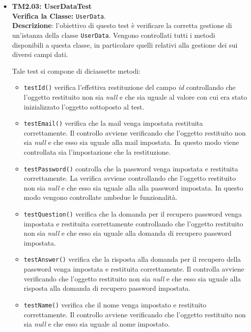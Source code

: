 \begin{itemize}
\item \textbf{TM2.03: UserDataTest}\\
\textbf{Verifica la Classe:} \texttt{UserData}.\\
\textbf{Descrizione}: l'obiettivo di questo test è verificare la corretta gestione di un'istanza della classe \texttt{UserData}. Vengono controllati tutti i metodi disponibili a questa classe, in particolare quelli relativi alla gestione dei sui diversi campi dati.

Tale test si compone di diciassette metodi:
\begin{itemize}

\item \texttt{testId()} verifica l'effettiva restituzione del campo \textit{id} controllando che l'oggetto restituito non sia \textit{null} e che sia uguale al valore con cui era stato inizializzato l'oggetto sottoposto al test.

\item \texttt{testEmail()} verifica che la mail venga impostata restituita correttamente. Il controllo avviene verificando che l'oggetto restituito non sia \textit{null} e che esso sia uguale alla mail impostata. In questo modo viene controllata sia l'impostazione che la restituzione. 

\item \texttt{testPassword()} controlla che la password venga impostata e restituita correttamente. La verifica avviene controllando che l'oggetto restituito non sia \textit{null} e che esso sia uguale alla alla password impostata. In questo modo vengono controllate ambedue le funzionalità.

\item \texttt{testQuestion()} verifica che la domanda per il recupero password venga impostata e restituita correttamente controllando che l'oggetto restituito non sia \textit{null} e che esso sia uguale alla domanda di recupero password impostata.

\item \texttt{testAnswer()} verifica che la risposta alla domanda per il recupero della password venga impostata e restituita correttamente. Il controlla avviene verificando che l'oggetto restituito non sia \textit{null} e che esso sia uguale alla risposta alla domanda di recupero password impostata. 

\item \texttt{testName()} verifica che il nome venga impostato e restituito correttamente. Il controllo avviene verificando che l'oggetto restituito non sia \textit{null} e che esso sia uguale al nome impostato.


\end{itemize}
\end{itemize}
